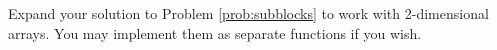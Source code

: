 \begin{problem}
Expand your solution to Problem \ref{prob:subblocks} to work with 2-dimensional
arrays.  You may implement them as separate functions if you wish.
\end{problem}


% 
